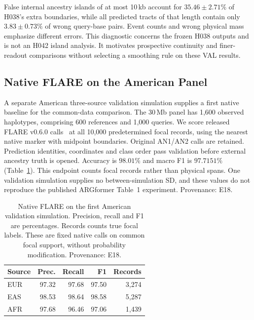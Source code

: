 \documentclass[letterpaper]{article}
\begin{document}
False internal ancestry islands of at most 10\,kb account for $35.46\pm2.71\%$ of H038's extra boundaries, while all predicted tracts of that length contain only $3.83\pm0.73\%$ of wrong query-base pairs. Event counts and wrong physical mass emphasize different errors. This diagnostic concerns the frozen H038 outputs and is not an H042 island analysis. It motivates prospective continuity and finer-readout comparisons without selecting a smoothing rule on these VAL results.


\subsection{Native FLARE on the American Panel}
A separate American three-source validation simulation supplies a first native baseline for the common-data comparison. The 30\,Mb panel has 1,600 observed haplotypes, comprising 600 references and 1,000 queries. We score released FLARE v0.6.0 calls~\citep{flare2023} at all 10,000 predetermined focal records, using the nearest native marker with midpoint boundaries. Original AN1/AN2 calls are retained. Prediction identities, coordinates and class order pass validation before external ancestry truth is opened. Accuracy is $98.01\%$ and macro F1 is $97.7151\%$ (Table~\ref{tab:americanflare}). This endpoint counts focal records rather than physical spans. One validation simulation supplies no between-simulation SD, and these values do not reproduce the published ARGformer Table~1 experiment. Provenance: E18.

\begin{table}[t]
\centering
\small
\begin{tabular}{@{}lrrrr@{}}
\toprule
Source & Prec. & Recall & F1 & Records \\
\midrule
EUR & 97.32 & 97.68 & 97.50 & 3,274 \\
EAS & 98.53 & 98.64 & 98.58 & 5,287 \\
AFR & 97.68 & 96.46 & 97.06 & 1,439 \\
\bottomrule
\end{tabular}
\caption{Native FLARE on the first American validation simulation. Precision, recall and F1 are percentages. Records counts true focal labels. These are fixed native calls on common focal support, without probability modification. Provenance: E18.}
\label{tab:americanflare}
\end{table}
\end{document}
